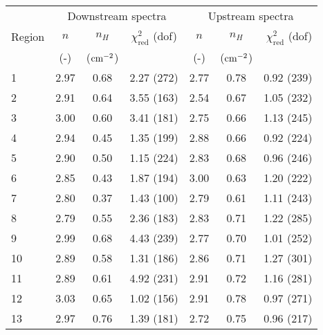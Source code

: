 \begin{tabular}{@{}lcccccr@{}}
\toprule
{} & \multicolumn{3}{c}{Downstream spectra}
   & \multicolumn{3}{c}{Upstream spectra} \\
\cmidrule(lr){2-4} \cmidrule(l){5-7}
Region & $n$ & $n_H$ & $\chi^2_{\mathrm{red}}$ (dof)
       & $n$ & $n_H$ & $\chi^2_{\mathrm{red}}$ (dof) \\
{} & (-) & ($\mathrm{cm}^{-2}$) & {}
   & (-) & ($\mathrm{cm}^{-2}$) & {} \\
\midrule
1 & 2.97 & 0.68 & 2.27 (272) & 2.77 & 0.78 & 0.92 (239) \\
2 & 2.91 & 0.64 & 3.55 (163) & 2.54 & 0.67 & 1.05 (232) \\
3 & 3.00 & 0.60 & 3.41 (181) & 2.75 & 0.66 & 1.13 (245) \\
4 & 2.94 & 0.45 & 1.35 (199) & 2.88 & 0.66 & 0.92 (224) \\
5 & 2.90 & 0.50 & 1.15 (224) & 2.83 & 0.68 & 0.96 (246) \\
6 & 2.85 & 0.43 & 1.87 (194) & 3.00 & 0.63 & 1.20 (222) \\
7 & 2.80 & 0.37 & 1.43 (100) & 2.79 & 0.61 & 1.11 (243) \\
8 & 2.79 & 0.55 & 2.36 (183) & 2.83 & 0.71 & 1.22 (285) \\
9 & 2.99 & 0.68 & 4.43 (239) & 2.77 & 0.70 & 1.01 (252) \\
10 & 2.89 & 0.58 & 1.31 (186) & 2.86 & 0.71 & 1.27 (301) \\
11 & 2.89 & 0.61 & 4.92 (231) & 2.91 & 0.72 & 1.16 (281) \\
12 & 3.03 & 0.65 & 1.02 (156) & 2.91 & 0.78 & 0.97 (271) \\
13 & 2.97 & 0.76 & 1.39 (181) & 2.72 & 0.75 & 0.96 (217) \\
\bottomrule
\end{tabular}
